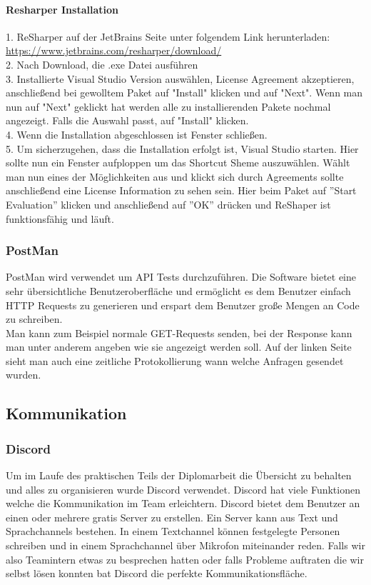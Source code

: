 \paragraph {Resharper Installation}
\label{sec:ResharperInstallation}
1. ReSharper auf der JetBrains Seite unter folgendem Link herunterladen: \break \url {https://www.jetbrains.com/resharper/download/} \\
2. Nach Download, die .exe Datei ausführen \\
3. Installierte Visual Studio Version auswählen, License Agreement akzeptieren, anschließend bei gewolltem Paket auf "Install" klicken und auf "Next". 
Wenn man nun auf "Next" geklickt hat werden alle zu installierenden Pakete nochmal angezeigt. Falls die Auswahl passt, auf "Install" klicken. \\
4. Wenn die Installation abgeschlossen ist Fenster schließen. \\
5. Um sicherzugehen, dass die Installation erfolgt ist, Visual Studio starten. Hier sollte nun ein Fenster aufploppen um das Shortcut Sheme auszuwählen.
Wählt man nun eines der Möglichkeiten aus und klickt sich durch Agreements sollte anschließend eine License Information zu sehen sein. Hier beim Paket auf ''Start Evaluation'' klicken und anschließend auf ''OK'' drücken und ReShaper ist funktionsfähig und läuft.

\subsubsection {PostMan}
\label{sec:PostMan}
PostMan wird verwendet um API Tests durchzuführen. Die Software bietet eine sehr übersichtliche Benutzeroberfläche und ermöglicht es dem Benutzer einfach HTTP Requests zu generieren und erspart dem Benutzer große Mengen an Code zu schreiben.\break
\textcite{TechnologiePostman} \\ \break
Man kann zum Beispiel normale GET-Requests senden, bei der Response kann man unter anderem angeben wie sie angezeigt werden soll. Auf der linken Seite sieht man auch eine zeitliche Protokollierung wann welche Anfragen gesendet wurden.

\subsection{Kommunikation}
\label{sec:Kommunikation}
\subsubsection {Discord}
\label{sec:Discord}
Um im Laufe des praktischen Teils der Diplomarbeit die Übersicht zu behalten und alles zu organisieren wurde Discord verwendet. Discord hat viele Funktionen welche die Kommunikation im Team erleichtern. Discord bietet dem Benutzer an einen oder mehrere gratis Server zu erstellen. Ein Server kann aus Text und Sprachchannels bestehen. In einem Textchannel können festgelegte Personen schreiben und in einem Sprachchannel über Mikrofon miteinander reden. Falls wir also Teamintern etwas zu besprechen hatten oder falls Probleme auftraten die wir selbst lösen konnten bat Discord die perfekte Kommunikationsfläche. 

